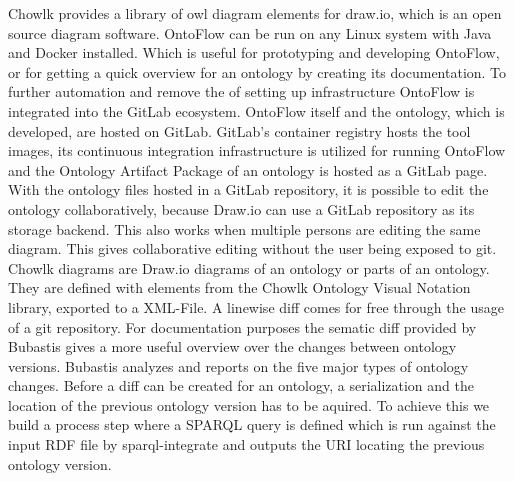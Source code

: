\documentclass[sigconf]{acmart}
\begin{document}
Chowlk provides a library of owl diagram elements for draw.io, which is an open source diagram software.
OntoFlow can be run on any Linux system with Java and Docker installed.
Which is useful for prototyping and developing OntoFlow, or for getting a quick overview for an ontology by creating its documentation.
To further automation and remove the of setting up infrastructure OntoFlow is integrated into the GitLab ecosystem.
OntoFlow itself and the ontology, which is developed, are hosted on GitLab.
GitLab's container registry hosts the tool images, its continuous integration infrastructure is utilized for running OntoFlow and the Ontology Artifact Package of an ontology is hosted as a GitLab page.
With the ontology files hosted in a GitLab repository, it is possible to edit the ontology collaboratively, because Draw.io can use a GitLab repository as its storage backend.
This also works when multiple persons are editing the same diagram.
This gives collaborative editing without the user being exposed to git.
Chowlk diagrams are Draw.io diagrams of an ontology or parts of an ontology.
They are defined with elements from the Chowlk Ontology Visual Notation library, exported to a XML-File.
A linewise diff comes for free through the usage of a git repository.
For documentation purposes the sematic diff provided by Bubastis gives a more useful overview over the changes between ontology versions.
Bubastis analyzes and reports on the five major types of ontology changes.
Before a diff can be created for an ontology, a serialization and the location of the previous ontology version has to be aquired. To achieve this we build a process step where a SPARQL query is defined which is run against the input RDF file by sparql-integrate and outputs the URI locating the previous ontology version.
\end{document}
